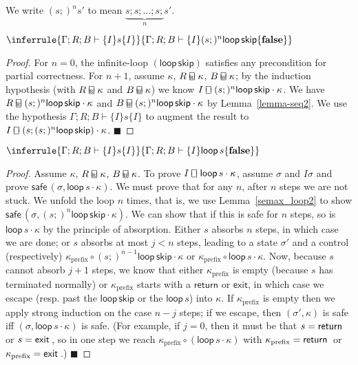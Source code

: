 \documentclass{llncs}
\newcommand{\guardbox}{\raisebox{1pt}{\makebox[0pt][l]{\(\sqcap\)}}{\raisebox{-1pt}{\(\sqcup\)}}}
\newcommand{\tyface}[1]{\ensuremath{\mathsf{#1}}}
\newcommand{\Sloop}[1]{\tyface{loop}\,#1}
\newcommand{\Sexit}[1]{\tyface{exit}\,#1}
\newcommand{\Sreturn}[1]{\tyface{return}\,#1}
\newcommand{\Sskip}{\tyface{skip}}
\newcommand{\Kseq}[2]{#1\cdot #2}
\newcommand{\guard}[3]{#2\: {\guardbox{}_{#1}}\: #3}
\newcommand{\rguard}[3]{#2\: \makebox[0pt][l]{\scriptsize \hspace{1pt}\textsc{r}}{\guardbox{}_{#1}}\: #3}
\newcommand{\bguard}[3]{#2\: \makebox[0pt][l]{\scriptsize \hspace{1pt}\textsc{b}}{\guardbox{}_{#1}}\: #3}
\newcommand{\Cont}[2]{(#1,#2)}
\newcommand{\st}{\sigma}
\newcommand{\ctl}{\kappa} \newcommand{\stmt}{\tyface{stmt}}
\newcommand{\safe}[1]{\tyface{safe}\,#1}
\newcommand{\semax}[6]{#1;#2;#3\vdash \{#4\}#5\{#6\}}
\newcommand{\FF}{\ensuremath{\mathrm{\mathbf{false}}}}
\begin{document}
\begin{definition}
We write $(s;)^n s'$ to mean
$\underbrace{s; s ; \ldots ; s ; {}}_{n} s'$.
\end{definition}
\vspace{-8pt}
\vspace{-7pt}
\begin{lemma}
\label{semax_loop2}
\(
\inferrule{\semax{\Gamma}{R}{B}{I}{s}{I}}
{\semax{\Gamma}{R}{B}{I}{(s;)^n \Sloop{\Sskip}}{\FF}}
\)
\begin{proof}
For $n=0$, the infinite-loop $(\Sloop{\Sskip})$ satisfies any precondition for
partial correctness.
For $n+1$, 
assume $\ctl$, 
$\rguard{}{R}{\ctl}$, 
$\bguard{}{B}{\ctl}$;
by the induction hypothesis (with $\rguard{}{R}{\ctl}$ and $\bguard{}{B}{\ctl}$)
we know $\guard{}{I}{(s;)^n\Sloop{\Sskip}\cdot\ctl}$.
We have 
$\rguard{}{R}{(s;)^n\Sloop{\Sskip}\cdot \ctl}$ and
$\bguard{}{B}{(s;)^n\Sloop{\Sskip}\cdot \ctl}$
by Lemma~\ref{lemma-seq2}.
We use the hypothesis $\semax{\Gamma}{R}{B}{I}{s}{I}$ to augment the result to
$\guard{}{I}{(s;(s;)^n\Sloop{\Sskip})\cdot\ctl}$. 
$\blacksquare$
\end{proof}
\end{lemma}

\begin{theorem}
\label{semax_loop1}
\(
\inferrule{\semax{\Gamma}{R}{B}{I}{s}{I}}
{\semax{\Gamma}{R}{B}{I}{\Sloop{s}}{\FF}}
\)
\begin{proof}
Assume $\ctl$, $\rguard{}{R}{\ctl}$, 
$\bguard{}{B}{\ctl}$.
To prove $\guard{}{I}{\Kseq{\Sloop{s}}{\ctl}}$,
assume $\st$ and $I\st$ and prove
$\safe{\Cont{\st}{\Kseq{\Sloop s}{\ctl}}}$.
We must prove that for any $n$, after $n$ steps we are not stuck.
We unfold the loop $n$ times, that is,
we use Lemma~\ref{semax_loop2} to show
$\safe{\Cont{\st}{(s ;)^n \Sloop{\Sskip} \cdot \ctl}}$.
We can show that if this is safe for $n$ steps,
so is $\Kseq{\Sloop s}{\ctl}$ by the principle of 
absorption.  Either $s$ absorbs $n$ steps, in which case we are done;
or $s$ absorbs at most $j<n$ steps, leading to a state $\st'$
and a control (respectively)
$\ctl_\textrm{prefix} \circ (s ;)^{n-1} \Sloop{\Sskip} \cdot \ctl$
or 
$\ctl_\textrm{prefix} \circ \Sloop{s} \cdot \ctl$.
Now, because $s$ cannot absorb $j+1$ steps,
we know that either $\ctl_\textrm{prefix}$ is empty
(because $s$ has terminated normally) or
$\ctl_\textrm{prefix}$ starts with a \tyface{return} or \tyface{exit},
in which case we escape (resp. past the $\Sloop{\Sskip}$
or the $\Sloop{s}$) into $\ctl$.
If $\ctl_\textrm{prefix}$ is empty then we apply strong induction
on the case $n-j$ steps; if we escape, then 
$\Cont{\st'}{\ctl}$ is safe iff 
$\Cont{\st}{\Kseq{\Sloop s}{\ctl}}$ is safe.
(For example, if $j=0$, then it must be that $s=\Sreturn$ or $s=\Sexit$, 
so in one step we reach $\ctl_\textrm{prefix} \circ (\Sloop{s} \cdot \ctl)$
with $\ctl_\textrm{prefix} = \Sreturn$ or $\ctl_\textrm{prefix} = \Sexit$.)
$\blacksquare$
\end{proof}
\end{theorem}
\end{document}
